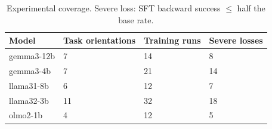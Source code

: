 \begin{table}[t]
\centering\small
\begin{tabular}{llll}
\toprule
Model & Task orientations & Training runs & Severe losses \\
\midrule
gemma3-12b & 7 & 14 & 8 \\
gemma3-4b & 7 & 21 & 14 \\
llama31-8b & 6 & 12 & 7 \\
llama32-3b & 11 & 32 & 18 \\
olmo2-1b & 4 & 12 & 5 \\
\bottomrule
\end{tabular}
\caption{Experimental coverage. Severe loss: SFT backward success $\leq$ half the base rate.}
\label{tab:core-inventory}
\end{table}
